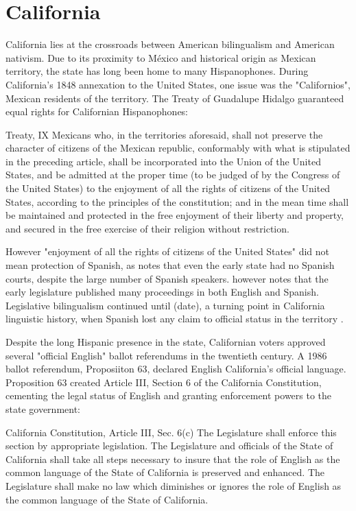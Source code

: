 \section{California}

California lies at the crossroads between American bilingualism and American
nativism. Due to its proximity to México and historical origin as Mexican
territory, the state has long been home to many Hispanophones. During
California's 1848 annexation to the United States, one issue was the
"Californios", Mexican residents of the territory. The Treaty of Guadalupe
Hidalgo guaranteed equal rights for Californian Hispanophones: 

\begin{aquote}{Treaty, IX}
	Mexicans who, in the territories aforesaid, shall not preserve the character
	of citizens of the Mexican republic, conformably with what is stipulated in
	the preceding article, shall be incorporated into the Union of the United
	States, and be admitted at the proper time (to be judged of by the Congress of
	the United States) to the enjoyment of all the rights of citizens of the
	United States, according to the principles of the constitution; and in the
	mean time shall be maintained and protected in the free enjoyment of their
	liberty and property, and secured in the free exercise of their religion
	without restriction.
\end{aquote}

However "enjoyment of all the rights of citizens of the United States" did not
mean protection of Spanish, as \textcite{lamar-prieto14} notes that even the
early state had no Spanish courts, despite the large number of Spanish speakers.
\textcite{baron92} however notes that the early legislature published many
proceedings in both English and Spanish. Legislative bilingualism continued
until (date), a turning point in California linguistic history, when Spanish
lost any claim to official status in the territory \parencite{baron02}.

Despite the long Hispanic presence in the state, Californian voters approved several
"official English" ballot referendums in the twentieth century. A 1986 ballot
referendum, Proposiiton 63, declared English California's official language.
Proposition 63 created Article III, Section 6 of the California Constitution,
cementing the legal status of English and granting enforcement powers to the
state government: 

\begin{aquote}{California Constitution, Article III, Sec. 6(c)}
	The Legislature shall enforce this section by appropriate legislation. The
	Legislature and officials of the State of California shall take all steps
	necessary to insure that the role of English as the common language of the
	State of California is preserved and enhanced. The Legislature shall make no
	law which diminishes or ignores the role of English as the common language of
	the State of California.
\end{aquote}


